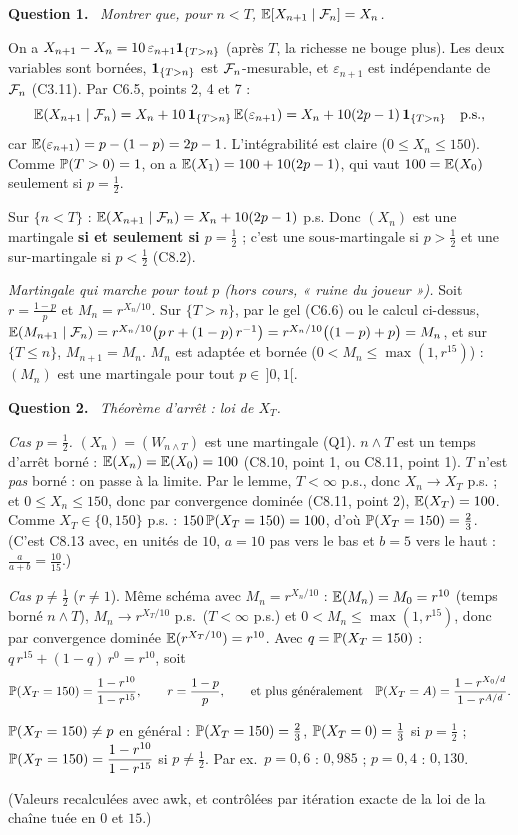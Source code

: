 \documentclass[11pt,a4paper]{article}
\newcommand{\question}[1]{\par\medskip\noindent\textbf{Question #1.}~}
\begin{document}
\begin{exo}
\question{1} \emph{Montrer que, pour $n<T$, $\mathbb{E}[X_{n+1}\mid\mathcal{F}_n]=X_n$.}

On a $X_{n+1}-X_n=10\,\varepsilon_{n+1}\mathbf{1}_{\{T>n\}}$ (après $T$, la richesse ne bouge plus). Les deux variables sont bornées,
$\mathbf{1}_{\{T>n\}}$ est $\mathcal{F}_n$-mesurable, et $\varepsilon_{n+1}$ est indépendante de $\mathcal{F}_n$ (C3.11). Par C6.5, points 2, 4 et 7 :
\[\mathbb{E}(X_{n+1}\mid\mathcal{F}_n)=X_n+10\,\mathbf{1}_{\{T>n\}}\,\mathbb{E}(\varepsilon_{n+1})=X_n+10(2p-1)\,\mathbf{1}_{\{T>n\}}\quad\text{p.s.},\]
car $\mathbb{E}(\varepsilon_{n+1})=p-(1-p)=2p-1$. L'intégrabilité est claire ($0\le X_n\le150$).
Comme $\mathbb{P}(T>0)=1$, on a $\mathbb{E}(X_1)=100+10(2p-1)$, qui vaut $100=\mathbb{E}(X_0)$ seulement si $p=\frac12$.
\begin{resultat}
Sur $\{n<T\}$ : $\mathbb{E}(X_{n+1}\mid\mathcal{F}_n)=X_n+10(2p-1)$ p.s. Donc $(X_n)$ est une martingale \textbf{si et seulement si $p=\frac12$} ;
c'est une sous-martingale si $p>\frac12$ et une sur-martingale si $p<\frac12$ (C8.2).
\end{resultat}
\emph{Martingale qui marche pour tout $p$ (hors cours, « ruine du joueur »).} Soit $r=\frac{1-p}p$ et $M_n=r^{X_n/10}$. Sur $\{T>n\}$,
par le gel (C6.6) ou le calcul ci-dessus,
$\mathbb{E}(M_{n+1}\mid\mathcal{F}_n)=r^{X_n/10}\bigl(p\,r+(1-p)\,r^{-1}\bigr)=r^{X_n/10}\bigl((1-p)+p\bigr)=M_n$, et sur $\{T\le n\}$, $M_{n+1}=M_n$.
$M_n$ est adaptée et bornée ($0<M_n\le\max(1,r^{15})$) : $(M_n)$ est une martingale pour tout $p\in\,]0,1[$.

\question{2} \emph{Théorème d'arrêt : loi de $X_T$.}

\emph{Cas $p=\frac12$.} $(X_n)=(W_{n\wedge T})$ est une martingale (Q1). $n\wedge T$ est un temps d'arrêt borné : $\mathbb{E}(X_n)=\mathbb{E}(X_0)=100$
(C8.10, point 1, ou C8.11, point 1). $T$ n'est \emph{pas} borné : on passe à la limite. Par le lemme, $T<\infty$ p.s., donc
$X_n\to X_T$ p.s. ; et $0\le X_n\le150$, donc par convergence dominée (C8.11, point 2), $\mathbb{E}(X_T)=100$. Comme $X_T\in\{0,150\}$ p.s. :
$150\,\mathbb{P}(X_T=150)=100$, d'où $\mathbb{P}(X_T=150)=\frac23$. (C'est C8.13 avec, en unités de $10$, $a=10$ pas vers le bas et $b=5$ vers le haut :
$\frac a{a+b}=\frac{10}{15}$.)

\emph{Cas $p\neq\frac12$} ($r\neq1$). Même schéma avec $M_n=r^{X_n/10}$ : $\mathbb{E}(M_n)=M_0=r^{10}$ (temps borné $n\wedge T$),
$M_n\to r^{X_T/10}$ p.s.\ ($T<\infty$ p.s.) et $0<M_n\le\max(1,r^{15})$, donc par convergence dominée $\mathbb{E}(r^{X_T/10})=r^{10}$.
Avec $q=\mathbb{P}(X_T=150)$ : $q\,r^{15}+(1-q)\,r^0=r^{10}$, soit
\begin{equation}\label{eq:ruine}
\mathbb{P}(X_T=150)=\frac{1-r^{10}}{1-r^{15}},\qquad r=\frac{1-p}p,\qquad\text{et plus généralement}\quad
\mathbb{P}(X_T=A)=\frac{1-r^{X_0/d}}{1-r^{A/d}}.
\end{equation}
\begin{resultat}
$\mathbb{P}(X_T=150)\neq p$ en général : $\mathbb{P}(X_T=150)=\frac23$, $\mathbb{P}(X_T=0)=\frac13$ si $p=\frac12$ ; $\mathbb{P}(X_T=150)=\dfrac{1-r^{10}}{1-r^{15}}$ si $p\neq\frac12$.
Par ex.\ $p=0{,}6$ : $0{,}985$ ; $p=0{,}4$ : $0{,}130$.
\end{resultat}
(Valeurs recalculées avec awk, et contrôlées par itération exacte de la loi de la chaîne tuée en $0$ et $15$.)


\end{exo}
\end{document}
